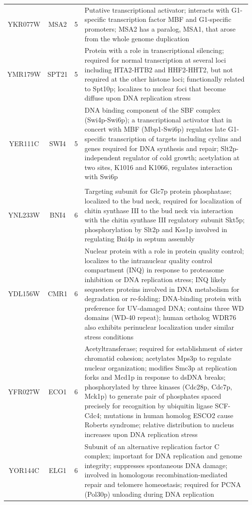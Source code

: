 \documentclass[]{article}
\begin{document}
\begin{longtable}{@{\extracolsep{3pt}} cccp{85mm}}
YKR077W & MSA2 & 5 & Putative transcriptional activator; interacts with G1-specific transcription factor MBF and G1-specific promoters; MSA2 has a paralog, MSA1, that arose from the whole genome duplication \\ 
YMR179W & SPT21 & 5 & Protein with a role in transcriptional silencing; required for normal transcription at several loci including HTA2-HTB2 and HHF2-HHT2, but not required at the other histone loci; functionally related to Spt10p; localizes to nuclear foci that become diffuse upon DNA replication stress \\ 
YER111C & SWI4 & 5 & DNA binding component of the SBF complex (Swi4p-Swi6p); a transcriptional activator that in concert with MBF (Mbp1-Swi6p) regulates late G1-specific transcription of targets including cyclins and genes required for DNA synthesis and repair; Slt2p-independent regulator of cold growth; acetylation at two sites, K1016 and K1066, regulates interaction with Swi6p \\   \hline \\ [-1.8ex] 
YNL233W & BNI4 & 6 & Targeting subunit for Glc7p protein phosphatase; localized to the bud neck, required for localization of chitin synthase III to the bud neck via interaction with the chitin synthase III regulatory subunit Skt5p; phosphorylation by Slt2p and Kss1p involved in regulating Bni4p in septum assembly \\ 
YDL156W & CMR1 & 6 & Nuclear protein with a role in protein quality control; localizes to the intranuclear quality control compartment (INQ) in response to proteasome inhibition or DNA replication stress; INQ likely sequesters proteins involved in DNA metabolism for degradation or re-folding; DNA-binding protein with preference for UV-damaged DNA; contains three WD domains (WD-40 repeat); human ortholog WDR76 also exhibits perinuclear localization under similar stress conditions \\ 
YFR027W & ECO1 & 6 & Acetyltransferase; required for establishment of sister chromatid cohesion; acetylates Mps3p to regulate nuclear organization; modifies Smc3p at replication forks and Mcd1p in response to dsDNA breaks; phosphorylated by three kinases (Cdc28p, Cdc7p, Mck1p) to generate pair of phosphates spaced precisely for recognition by ubiquitin ligase SCF-Cdc4; mutations in human homolog ESCO2 cause Roberts syndrome; relative distribution to nucleus increases upon DNA replication stress \\ 
YOR144C & ELG1 & 6 & Subunit of an alternative replication factor C complex; important for DNA replication and genome integrity; suppresses spontaneous DNA damage; involved in homologous recombination-mediated repair and telomere homeostasis; required for PCNA (Pol30p) unloading during DNA replication \\ 

\end{longtable}
\end{document}
